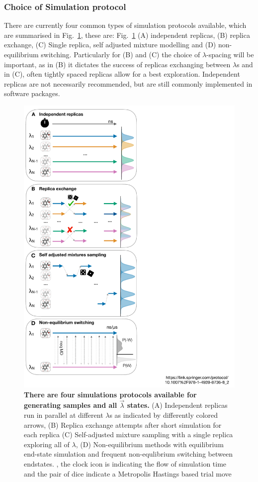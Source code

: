 \documentclass[9pt,bestpractices]{livecoms}
\begin{document}
\subsubsection{Choice of Simulation protocol}
There are currently four common types of simulation protocols available, which are summarised in Fig.~\ref{fig:protocols}, these are: Fig.~\ref{fig:protocols} (A) independent replicas, (B) replica exchange, (C) Single replica, self adjusted mixture modelling and (D) non-equilibrium switching. Particularly for (B) and (C) the choice of $\lambda$-spacing will be important, as in (B) it dictates the success of replicas exchanging between $\lambda$s and in (C), often tightly spaced replicas allow for a best exploration. Independent replicas are not necessarily recommended, but are still commonly implemented in software packages. 
\begin{figure}
    \includegraphics[width=0.95\linewidth]{figures/setup/protocol/Figure.pdf}
    \caption{\textbf{There are four simulations protocols available for generating samples and all $\vec{\lambda}$ states.} (A) Independent replicas run in parallel at different $\lambda$s as indicated by differently colored arrows, (B) Replica exchange attempts after short simulation for each replica (C) Self-adjusted mixture sampling with a single replica exploring all of $\lambda$, (D) Non-equilibrium methods with equilibrium end-state simulation and frequent non-equlibrium switching between endstates. , the clock icon is indicating the flow of simulation time and the pair of dice indicate a Metropolis Hastings based trial move}
    \label{fig:protocols}
\end{figure}
\end{document}
